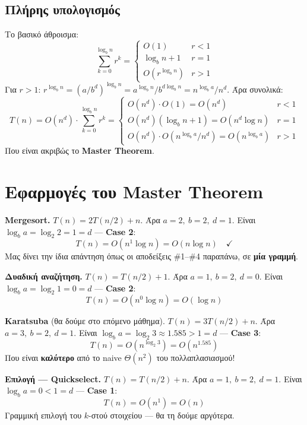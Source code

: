 \documentclass[11pt,a4paper]{article}
\begin{document}
\subsection{Πλήρης υπολογισμός}

Το βασικό άθροισμα:
\[
\sum_{k=0}^{\log_b n} r^k = \begin{cases}
O(1)            & r < 1 \\
\log_b n + 1    & r = 1 \\
O(r^{\log_b n}) & r > 1
\end{cases}
\]
Για $r > 1$: $r^{\log_b n} = (a/b^d)^{\log_b n} = a^{\log_b n} / b^{d \log_b n} =
n^{\log_b a} / n^d$. Άρα συνολικά:
\[
T(n) = O(n^d) \cdot \sum_{k=0}^{\log_b n} r^k = \begin{cases}
O(n^d) \cdot O(1) = O(n^d) & r < 1 \\
O(n^d)(\log_b n + 1) = O(n^d \log n) & r = 1 \\
O(n^d) \cdot O(n^{\log_b a}/n^d) = O(n^{\log_b a}) & r > 1
\end{cases}
\]
Που είναι ακριβώς το \textbf{Master Theorem}.

\section{Εφαρμογές του Master Theorem}

\begin{examplebox}
\textbf{Mergesort.} $T(n) = 2 T(n/2) + n$. Άρα $a = 2,\ b = 2,\ d = 1$. Είναι
$\log_b a = \log_2 2 = 1 = d$ --- \textbf{Case 2}:
\[
T(n) = O(n^1 \log n) = O(n \log n) \quad \checkmark
\]
Μας δίνει την ίδια απάντηση όπως οι αποδείξεις \#1--\#4 παραπάνω, σε \textbf{μία
γραμμή}.
\end{examplebox}

\begin{examplebox}
\textbf{Δυαδική αναζήτηση.} $T(n) = T(n/2) + 1$. Άρα $a = 1,\ b = 2,\ d = 0$.
Είναι $\log_b a = \log_2 1 = 0 = d$ --- \textbf{Case 2}:
\[
T(n) = O(n^0 \log n) = O(\log n)
\]
\end{examplebox}

\begin{examplebox}
\textbf{Karatsuba} (θα δούμε στο επόμενο μάθημα). $T(n) = 3 T(n/2) + n$. Άρα
$a = 3,\ b = 2,\ d = 1$. Είναι $\log_b a = \log_2 3 \approx 1.585 > 1 = d$ ---
\textbf{Case 3}:
\[
T(n) = O(n^{\log_2 3}) = O(n^{1.585})
\]
Που είναι \textbf{καλύτερο} από το naive $\Theta(n^2)$ του πολλαπλασιασμού!
\end{examplebox}

\begin{examplebox}
\textbf{Επιλογή --- Quickselect.} $T(n) = T(n/2) + n$. Άρα $a = 1,\ b = 2,\
d = 1$. Είναι $\log_b a = 0 < 1 = d$ --- \textbf{Case 1}:
\[
T(n) = O(n^1) = O(n)
\]
Γραμμική επιλογή του $k$-στού στοιχείου --- θα τη δούμε αργότερα.
\end{examplebox}
\end{document}
